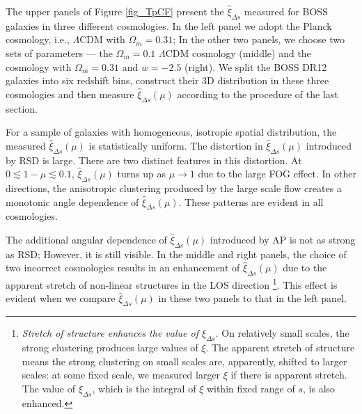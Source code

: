 \documentclass[iop]{emulateapj}
\begin{document}



The upper panels of Figure \ref{fig_TpCF} present the $\hat \xi_{\Delta s}$ measured for BOSS galaxies in three different cosmologies.
In the left panel we adopt the Planck cosmology, i.e., $\Lambda$CDM with $\Omega_m=0.31$;
In the other two panels, we choose two sets of parameters ---
the $\Omega_m=0.1$ $\Lambda$CDM cosmology (middle) and the cosmology with $\Omega_m=0.31$ and $w=-2.5$ (right).
We split the BOSS DR12 galaxies into six redshift bins,
construct their 3D distribution in these three cosmologies
and then measure $\hat \xi_{\Delta s}(\mu)$ according to the procedure of the last section.

For a sample of galaxies with homogeneous, isotropic spatial distribution, 
the measured $\hat \xi_{\Delta s}(\mu)$ is statistically uniform.
The distortion in $\hat \xi_{\Delta s}(\mu)$ introduced by RSD is large.
There are two distinct features in this distortion.
At $0\lesssim 1-\mu \lesssim 0.1$, $\hat \xi_{\Delta s}(\mu)$ turns up as $\mu\rightarrow1$
due to the large FOG effect.
In other directions, the anisotropic clustering produced by the large scale flow creates a monotonic angle dependence of $\hat\xi_{\Delta s}(\mu)$. %
These patterns are evident in all cosmologies.




The additional angular dependence of $\hat \xi_{\Delta s}(\mu)$ introduced by AP is not as strong as RSD;
However, it is still visible. 
In the middle and right panels, %
the choice of two incorrect cosmologies results in an enhancement of  $\hat \xi_{\Delta s}(\mu)$ due to the 
apparent stretch of non-linear structures in the LOS direction
\footnote{{\it Stretch of structure enhances the value of $\xi_{\Delta s}$}.
On relatively small scales, the strong clustering produces large values of $\xi$.
The apparent stretch of structure means the strong clustering on small scales are, apparently, shifted to larger scales:
at some fixed scale, we measured larger $\xi$ if there is apparent stretch.
The value of $\xi_{\Delta s}$, which is the integral of $\xi$ within fixed range of $s$, is also enhanced.}.
This effect is evident when we compare  $\hat \xi_{\Delta s}(\mu)$ in these two panels to that in the left panel.
\end{document}
